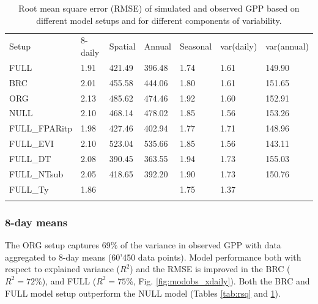 \documentclass[gmd, manuscript]{copernicus}
\begin{document}
\begin{table}
\caption{Root mean square error (RMSE) of simulated and observed GPP based on different model setups and for different components of variability.} 
\begin{tabular}{lllllll}
  \tophline
  Setup & 8-daily & Spatial & Annual & Seasonal & var(daily) & var(annual) \\ 
  \middlehline
  FULL & 1.91 & 421.49 & 396.48 & 1.74 & 1.61 & 149.90 \\ 
  BRC & 2.01 & 455.58 & 444.06 & 1.80 & 1.61 & 151.65 \\ 
  ORG & 2.13 & 485.62 & 474.46 & 1.92 & 1.60 & 152.91 \\ 
  NULL & 2.10 & 468.14 & 478.02 & 1.85 & 1.56 & 153.26 \\ 
  \middlehline
  FULL\_FPARitp & 1.98 & 427.46 & 402.94 & 1.77 & 1.71 & 148.96 \\ 
  FULL\_EVI & 2.10 & 523.04 & 535.66 & 1.85 & 1.56 & 143.11 \\ 
  \middlehline
  FULL\_DT & 2.08 & 390.45 & 363.55 & 1.94 & 1.73 & 155.03 \\ 
  FULL\_NTsub & 2.05 & 418.65 & 392.20 & 1.90 & 1.73 & 150.76 \\ 
  FULL\_Ty & 1.86 &  &  & 1.75 & 1.37 & \\ 
  \bottomhline
  \end{tabular}
\label{tab:rmse}
\end{table}

\subsubsection{8-day means}

The ORG setup captures 69\% of the variance in observed GPP with data aggregated to 8-day means (60’450 data points). Model performance both with respect to explained variance ($R^2$) and the RMSE is improved in the BRC  ($R^2 = 72$\%), and FULL ($R^2 = 75$\%, Fig. \ref{fig:modobs_xdaily}). Both the BRC and FULL model setup outperform the NULL model (Tables \ref{tab:rsq} and \ref{tab:rmse}).
\end{document}
